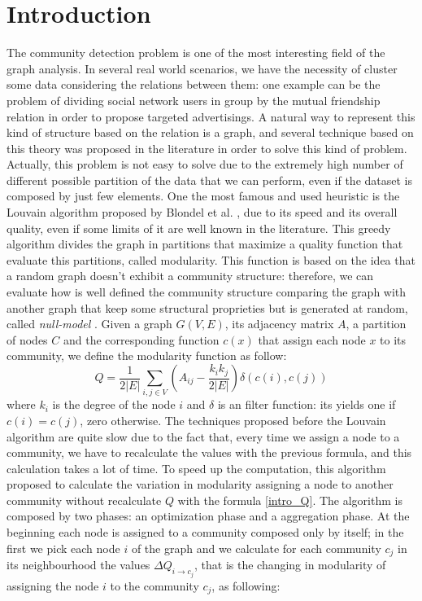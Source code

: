 \section{Introduction}
The community detection problem is one of the most interesting field of the graph analysis. In several real world scenarios, we have the necessity of cluster some data considering the relations between them: one example can be the problem of dividing social network users in group by the mutual friendship relation in order to propose targeted advertisings. A natural way to represent this kind of structure based on the relation is a graph, and several technique based on this theory was proposed in the literature in order to solve this kind of problem. Actually, this problem is not easy to solve due to the extremely high number of different possible partition of the data that we can perform, even if the dataset is composed by just few elements.
One the most famous and used heuristic is the Louvain algorithm proposed by Blondel et al. \cite{Blondel_2008}, due to its speed and its overall quality, even if some limits of it are well known in the literature. This greedy algorithm divides the graph in partitions that maximize a quality function that evaluate this partitions, called modularity. This function is based on the idea that a random graph doesn't exhibit a community structure: therefore, we can evaluate how is well defined the community structure comparing the graph with another graph that keep some structural proprieties but is generated at random, called \textit{null-model} \cite{Girvan2002Community}. Given a graph $G(V,E)$, its adjacency matrix $A$, a partition of nodes $C$ and the corresponding function $c(x)$ that assign each node $x$ to its community, we define the modularity function as follow:
\begin{equation}\label{intro_Q}
Q = \frac{1}{2|E|} \sum_{i,j \in V}\left(A_{ij} - \frac{k_ik_j}{2|E|}\right) \delta(c(i), c(j))
\end{equation}
where $k_i$ is the degree of the node $i$ and $\delta$ is an filter function: its yields one if $c(i) = c(j)$, zero otherwise.
The techniques proposed before the Louvain algorithm are quite slow due to the fact that, every time we assign a node to a community, we have to recalculate the values with the previous formula, and this calculation takes a lot of time. To speed up the computation, this algorithm proposed to calculate the variation in modularity assigning a node to another community without recalculate $Q$ with the formula \ref{intro_Q}. The algorithm is composed by two phases: an optimization phase and a aggregation phase. At the beginning each node is assigned to a community composed only by itself; in the first we pick each node $i$ of the graph and we calculate for each community $c_j$ in its neighbourhood the values $\Delta Q_{i \rightarrow c_j}$, that is the changing in modularity of assigning the node $i$ to the community $c_j$, as following:
